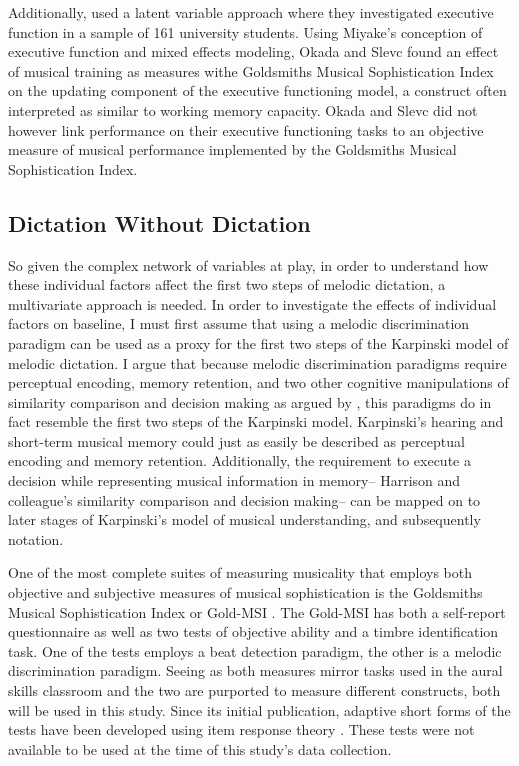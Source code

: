 \documentclass[]{book}
\begin{document}
Additionally, \citet{okadaIndividualDifferencesMusical2018} used a latent variable approach where they investigated executive function in a sample of 161 university students.
Using Miyake's conception of executive function \citep{miyakeNatureOrganizationIndividual2012, miyakeUnityDiversityExecutive2000} and mixed effects modeling, Okada and Slevc found an effect of musical training as measures withe Goldsmiths Musical Sophistication Index on the updating component of the executive functioning model, a construct often interpreted as similar to working memory capacity.
Okada and Slevc did not however link performance on their executive functioning tasks to an objective measure of musical performance implemented by the Goldsmiths Musical Sophistication Index.

\hypertarget{dictation-without-dictation}{%
\subsection{Dictation Without Dictation}\label{dictation-without-dictation}}

So given the complex network of variables at play, in order to understand how these individual factors affect the first two steps of melodic dictation, a multivariate approach is needed.
In order to investigate the effects of individual factors on baseline, I must first assume that using a melodic discrimination paradigm can be used as a proxy for the first two steps of the Karpinski model of melodic dictation.
I argue that because melodic discrimination paradigms require perceptual encoding, memory retention, and two other cognitive manipulations of similarity comparison and decision making as argued by \citet{harrisonModellingMelodicDiscrimination2016}, this paradigms do in fact resemble the first two steps of the Karpinski model.
Karpinski's hearing and short-term musical memory could just as easily be described as perceptual encoding and memory retention.
Additionally, the requirement to execute a decision while representing musical information in memory-- Harrison and colleague's similarity comparison and decision making-- can be mapped on to later stages of Karpinski's model of musical understanding, and subsequently notation.

One of the most complete suites of measuring musicality that employs both objective and subjective measures of musical sophistication is the Goldsmiths Musical Sophistication Index or Gold-MSI \citep{mullensiefenMusicalityNonMusiciansIndex2014}.
The Gold-MSI has both a self-report questionnaire as well as two tests of objective ability and a timbre identification task.
One of the tests employs a beat detection paradigm, the other is a melodic discrimination paradigm.
Seeing as both measures mirror tasks used in the aural skills classroom and the two are purported to measure different constructs, both will be used in this study.
Since its initial publication, adaptive short forms of the tests have been developed using item response theory \citep{harrisonApplyingModernPsychometric2017a}.
These tests were not available to be used at the time of this study's data collection.
\end{document}
